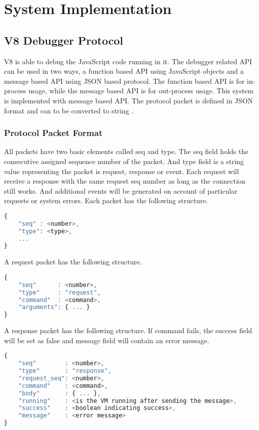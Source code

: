 \chapter {System Implementation}

\section {V8 Debugger Protocol}
V8 is able to debug the JavaScript code running in it. The debugger related API can be used in two ways, a function based API using JavaScript objects and a message based API using JSON based protocol. The function based API is for in-process usage, while the message based API is for out-process usage. This system is implemented with message based API. The protocol packet is defined in JSON format and can to be converted to string \cite{V8}.

\subsection {Protocol Packet Format}
All packets have two basic elements called seq and type. The seq field holds the consecutive assigned sequence number of the packet. And type field is a string value representing the packet is request, response or event. Each request will receive a response with the same request seq number as long as the connection still works. And additional events will be generated on account of particular requests or system errors. Each packet has the following structure.

\begin{lstlisting}[language=JavaScript]
{
	"seq" : <number>,
	"type": <type>,
	...
}
\end{lstlisting}

A request packet has the following structure.

\begin{lstlisting}[language=JavaScript]
{
	"seq"      : <number>,
	"type"     : "request",
	"command"  : <command>,
	"arguments": { ... }
}
\end{lstlisting}

A response packet has the following structure. If command fails, the success field will be set as false and message field will contain an error message.

\begin{lstlisting}[language=JavaScript]
{
	"seq"        : <number>,
	"type"       : "response",
	"request_seq": <number>,
	"command"    : <command>,
	"body"       : { ... },
	"running"    : <is the VM running after sending the message>,
	"success"    : <boolean indicating success>,
	"message"    : <error message>
}
\end{lstlisting}

